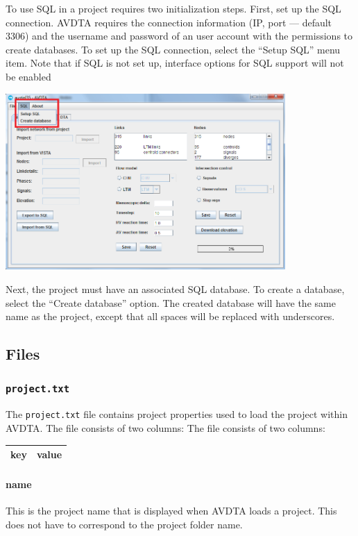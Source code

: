 To use SQL in a project requires two initialization steps. First, set up the SQL connection. AVDTA requires the connection information (IP, port --- default 3306) and the username and password of an user account with the permissions to create databases. To set up the SQL connection, select the ``Setup SQL'' menu item. Note that if SQL is not set up, interface options for SQL support will not be enabled
\begin{center}
\includegraphics[width=0.8\textwidth]{images/sql1.png}
\end{center}
Next, the project must have an associated SQL database. To create a database, select the ``Create database'' option. The created database will have the same name as the project, except that all spaces will be replaced with underscores.


\subsection{Files}

\subsubsection{\texttt{project.txt}}
The \texttt{project.txt} file contains project properties used to load the project within AVDTA. The file consists of two columns:
 The file consists of two columns:
\begin{center}
\begin{tabular}{cc}
\hline
key & value\\\hline
\end{tabular}
\end{center}


\paragraph*{name}
This is the project name that is displayed when AVDTA loads a project. This does not have to correspond to the project folder name.

